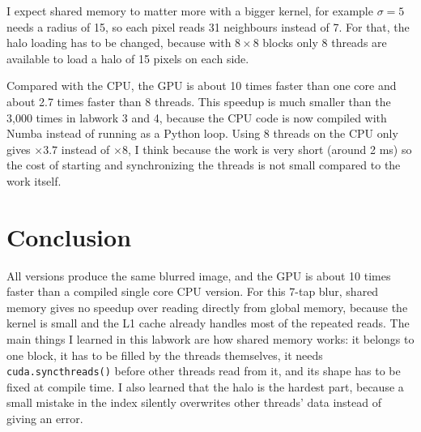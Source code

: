 \documentclass[11pt]{article}
\begin{document}
I expect shared memory to matter more with a bigger kernel, for example $\sigma = 5$ needs a radius of 15, so each pixel reads 31 neighbours instead of 7. For that, the halo loading has to be changed, because with $8 \times 8$ blocks only 8 threads are available to load a halo of 15 pixels on each side.

Compared with the CPU, the GPU is about 10 times faster than one core and about 2.7 times faster than 8 threads. This speedup is much smaller than the 3,000 times in labwork 3 and 4, because the CPU code is now compiled with Numba instead of running as a Python loop. Using 8 threads on the CPU only gives $\times 3.7$ instead of $\times 8$, I think because the work is very short (around 2 ms) so the cost of starting and synchronizing the threads is not small compared to the work itself.

\section{Conclusion}

All versions produce the same blurred image, and the GPU is about 10 times faster than a compiled single core CPU version. For this 7-tap blur, shared memory gives no speedup over reading directly from global memory, because the kernel is small and the L1 cache already handles most of the repeated reads. The main things I learned in this labwork are how shared memory works: it belongs to one block, it has to be filled by the threads themselves, it needs \texttt{cuda.syncthreads()} before other threads read from it, and its shape has to be fixed at compile time. I also learned that the halo is the hardest part, because a small mistake in the index silently overwrites other threads' data instead of giving an error.
\end{document}
